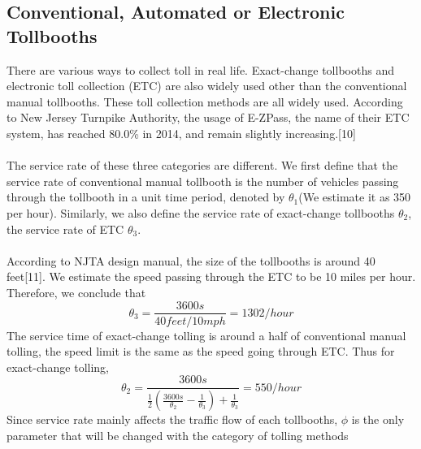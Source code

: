 \subsection{Conventional, Automated or Electronic Tollbooths}
There are various ways to collect toll in real life. Exact-change tollbooths and electronic toll collection (ETC) are also widely used other than the conventional manual tollbooths. These toll collection methods are all widely used. According to New Jersey Turnpike Authority, the usage of E-ZPass, the name of their ETC system, has reached 80.0\% in 2014, and remain slightly increasing.[10]\\
\\
The service rate of these three categories are different. We first define that the service rate of conventional manual tollbooth is the number of vehicles passing through the tollbooth in a unit time period, denoted by $\theta_{1}$(We estimate it as 350 per hour). Similarly, we also define the service rate of exact-change tollbooths $\theta_{2}$, the service rate of ETC $\theta_{3}$.\\
\\
According to NJTA design manual, the size of the tollbooths is around 40 feet[11]. We estimate the speed passing through the ETC to be 10 miles per hour. Therefore, we conclude that\\
\[
\theta_{3} = \frac{3600s}{40feet/10mph} = 1302/hour
\]
The service time of exact-change tolling is around a half of conventional manual tolling, the speed limit is the same as the speed going through ETC. Thus for exact-change tolling,\\
\[
\theta_{2} = \frac{3600s}{\frac{1}{2}(\frac{3600s}{\theta_{2}}-\frac{1}{\theta_{3}})+\frac{1}{\theta_{3}}} = 550 /hour
\]
Since service rate mainly affects the traffic flow of each tollbooths, $\phi$ is the only parameter that will be changed with the category of tolling methods


